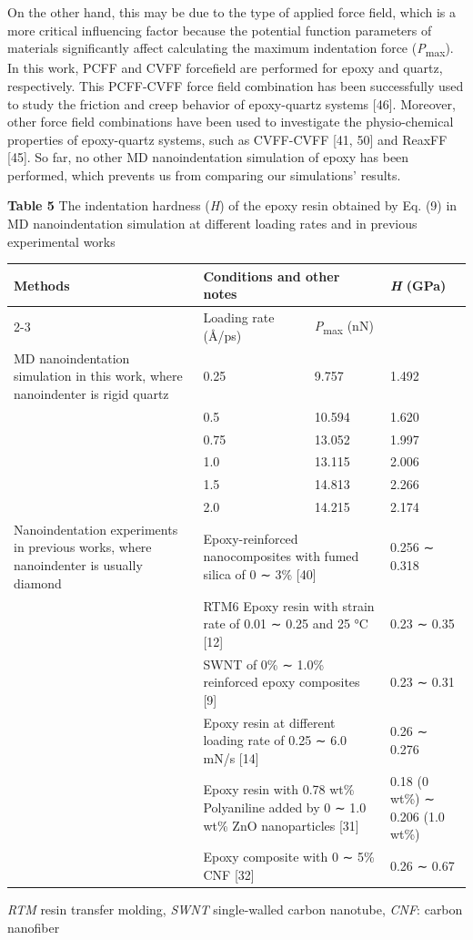 \documentclass{article}
\begin{document}
On the other hand, this may be due to the type of applied force field, which is a more critical influencing factor because the potential function parameters of materials significantly affect calculating the maximum indentation force (\emph{P}\textsubscript{max}). In this work, PCFF and CVFF forcefield are performed for epoxy and quartz, respectively. This PCFF-CVFF force field combination has been successfully used to study the friction and creep behavior of epoxy-quartz systems [46]. Moreover, other force field combinations have been used to investigate the physio-chemical properties of epoxy-quartz systems, such as CVFF-CVFF [41, 50] and ReaxFF [45]. So far, no other MD nanoindentation simulation of epoxy has been performed, which prevents us from comparing our simulations’ results.

\noindent\textbf{Table 5} The indentation hardness (\emph{H}) of the epoxy resin obtained by Eq. (9) in MD nanoindentation simulation at different loading rates and in previous experimental works
\begin{center}\footnotesize
\begin{tabular}{p{4.0cm}p{1.6cm}p{1.2cm}p{2.4cm}}
\toprule
Methods & \multicolumn{2}{l}{Conditions and other notes} & \emph{H} (GPa)\\
\cmidrule{2-3}
 & Loading rate (Å/ps) & \emph{P}\textsubscript{max} (nN) & \\
\midrule
MD nanoindentation simulation in this work, where nanoindenter is rigid quartz & 0.25 & 9.757 & 1.492\\
 & 0.5 & 10.594 & 1.620\\
 & 0.75 & 13.052 & 1.997\\
 & 1.0 & 13.115 & 2.006\\
 & 1.5 & 14.813 & 2.266\\
 & 2.0 & 14.215 & 2.174\\
Nanoindentation experiments in previous works, where nanoindenter is usually diamond & \multicolumn{2}{p{3.0cm}}{Epoxy-reinforced nanocomposites with fumed silica of 0 ∼ 3\% [40]} & 0.256 ∼ 0.318\\
 & \multicolumn{2}{p{3.0cm}}{RTM6 Epoxy resin with strain rate of 0.01 ∼ 0.25 and 25 °C [12]} & 0.23 ∼ 0.35\\
 & \multicolumn{2}{p{3.0cm}}{SWNT of 0\% ∼ 1.0\% reinforced epoxy composites [9]} & 0.23 ∼ 0.31\\
 & \multicolumn{2}{p{3.0cm}}{Epoxy resin at different loading rate of 0.25 ∼ 6.0 mN/s [14]} & 0.26 ∼ 0.276\\
 & \multicolumn{2}{p{3.0cm}}{Epoxy resin with 0.78 wt\% Polyaniline added by 0 ∼ 1.0 wt\% ZnO nanoparticles [31]} & 0.18 (0 wt\%) ∼ 0.206 (1.0 wt\%)\\
 & \multicolumn{2}{p{3.0cm}}{Epoxy composite with 0 ∼ 5\% CNF [32]} & 0.26 ∼ 0.67\\
\bottomrule
\end{tabular}
\end{center}
{\footnotesize\noindent \emph{RTM} resin transfer molding, \emph{SWNT} single-walled carbon nanotube, \emph{CNF}: carbon nanofiber\par}
\end{document}
